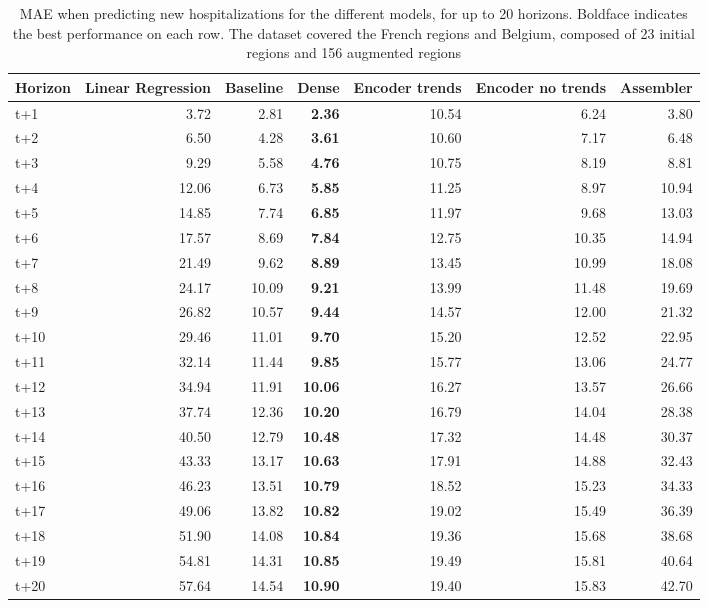 \begin{table}[H]
\centering
\caption{MAE when predicting new hospitalizations for the different models, for up to 20 horizons. Boldface indicates the best performance on each row. The dataset covered the French regions and Belgium, composed of 23 initial regions and 156 augmented regions }
\label{tab:MAE_comparison}
\begin{tabular}{lrrrrrr}
\toprule
Horizon &  Linear Regression &  Baseline &  Dense &  Encoder trends &  Encoder no trends &  Assembler \\
\midrule
t+1  & 3.72  & 2.81  & \textbf{2.36}  & 10.54  & 6.24  & 3.80  \\
t+2  & 6.50  & 4.28  & \textbf{3.61}  & 10.60  & 7.17  & 6.48  \\
t+3  & 9.29  & 5.58  & \textbf{4.76}  & 10.75  & 8.19  & 8.81  \\
t+4  & 12.06  & 6.73  & \textbf{5.85}  & 11.25  & 8.97  & 10.94  \\
t+5  & 14.85  & 7.74  & \textbf{6.85}  & 11.97  & 9.68  & 13.03  \\
t+6  & 17.57  & 8.69  & \textbf{7.84}  & 12.75  & 10.35  & 14.94  \\
t+7  & 21.49  & 9.62  & \textbf{8.89}  & 13.45  & 10.99  & 18.08  \\
t+8  & 24.17  & 10.09  & \textbf{9.21}  & 13.99  & 11.48  & 19.69  \\
t+9  & 26.82  & 10.57  & \textbf{9.44}  & 14.57  & 12.00  & 21.32  \\
t+10  & 29.46  & 11.01  & \textbf{9.70}  & 15.20  & 12.52  & 22.95  \\
t+11  & 32.14  & 11.44  & \textbf{9.85}  & 15.77  & 13.06  & 24.77  \\
t+12  & 34.94  & 11.91  & \textbf{10.06}  & 16.27  & 13.57  & 26.66  \\
t+13  & 37.74  & 12.36  & \textbf{10.20}  & 16.79  & 14.04  & 28.38  \\
t+14  & 40.50  & 12.79  & \textbf{10.48}  & 17.32  & 14.48  & 30.37  \\
t+15  & 43.33  & 13.17  & \textbf{10.63}  & 17.91  & 14.88  & 32.43  \\
t+16  & 46.23  & 13.51  & \textbf{10.79}  & 18.52  & 15.23  & 34.33  \\
t+17  & 49.06  & 13.82  & \textbf{10.82}  & 19.02  & 15.49  & 36.39  \\
t+18  & 51.90  & 14.08  & \textbf{10.84}  & 19.36  & 15.68  & 38.68  \\
t+19  & 54.81  & 14.31  & \textbf{10.85}  & 19.49  & 15.81  & 40.64  \\
t+20  & 57.64  & 14.54  & \textbf{10.90}  & 19.40  & 15.83  & 42.70  \\

\bottomrule
\end{tabular}
\end{table}
